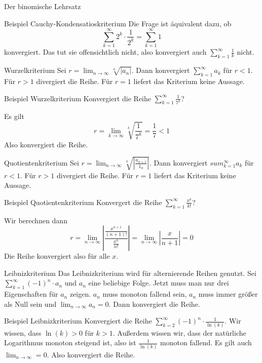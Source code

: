 \documentclass[german]{spicker}
\begin{document}
\begin{defi}{Der binomische Lehrsatz}
\begin{bonus}{Beispiel Cauchy-Kondensatioskriterium}
    Die Frage ist äquivalent dazu, ob
    \[
        \sum_{k=1}^{\infty} 2^k \cdot \frac{1}{2^k} = \sum_{k=1}^{\infty} 1
    \]
    konvergiert. Das tut sie offensichtlich nicht, also konvergiert auch $\sum_{k=1}^{\infty} \frac{1}{k}$ nicht.
\end{bonus}
\begin{algo}{Wurzelkriterium}
    Sei $r = \lim_{n\to\infty} \sqrt[n]{|a_n|}$.
    Dann konvergiert $\sum_{k=1}^{\infty} a_k$ für $r<1$.
    Für $r>1$ divergiert die Reihe.
    Für $r=1$ liefert das Kriterium keine Aussage.
\end{algo}
\begin{bonus}{Beispiel Wurzelkriterium}
    Konvergiert die Reihe $\sum_{k=1}^{\infty} \frac{1}{7^k}$?

    Es gilt
    \[
        r = \lim_{k\to\infty} \sqrt[k]{\frac{1}{7^k}} = \frac{1}{7} < 1
    \]
    Also konvergiert die Reihe.
\end{bonus}
\begin{algo}{Quotientenkriterium}
    Sei $r = \lim_{n\to\infty} \sqrt[n]{\left| \frac{a_{n+1}}{1_n} \right|}$.
    Dann konvergiert $sum_{k=1}^{\infty} a_k$ für $r<1$.
    Für $r>1$ divergiert die Reihe.
    Für $r=1$ liefert das Kriterium keine Aussage.
\end{algo}
\begin{bonus}{Beispiel Quotientenkriterium}
    Konvergert die Reihe $\sum_{k=1}^{\infty} \frac{x^k}{k!}$?

    Wir berechnen dann 
    \[
        r = \lim_{n\to\infty} \left| \frac{\frac{x^{n+1}}{(n+1)!}}{\frac{x^n}{n!}} \right|
        = \lim_{n\to\infty} \left| \frac{x}{n+1} \right| = 0
    \]
    Die Reihe konvergiert also für alle $x$.
\end{bonus}
\begin{algo}{Leibnizkriterium}
    Das Leibnizkriterium wird für alternierende Reihen genutzt.
    Sei $\sum_{k=1}^{\infty} (-1)^n \cdot a_n$ und $a_n$ eine beliebige Folge.
    Jetzt muss man nur drei Eigenschaften für $a_n$ zeigen. $a_n$ muss monoton fallend sein, $a_n$ muss immer größer als Null sein und $\lim_{n\to\infty} a_n =0$.
    Dann konvergiert die Reihe.
\end{algo}
\begin{bonus}{Beispiel Leibnizkriterium}
    Konvergiert die Reihe $\sum_{k=2}^{\infty} (-1)^n \cdot \frac{1}{\ln(k)}$.
    Wir wissen, dass $\ln(k) > 0$ für $k>1$.
    Außerdem wissen wir, dass der natürliche Logarithmus monoton steigend ist, also ist $\frac{1}{\ln(k)}$ monoton fallend.
    Es gilt auch $\lim_{n\to\infty} = 0$. Also konvergiert die Reihe.
\end{bonus}


\end{defi}
\end{document}
